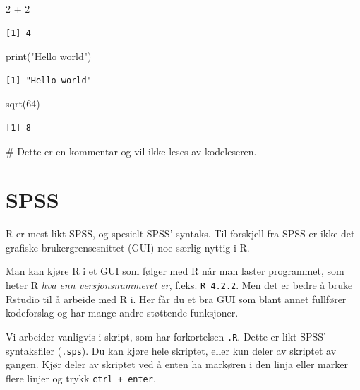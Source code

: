 \documentclass[
  letterpaper,
  DIV=11,
  numbers=noendperiod]{scrreprt}
\newenvironment{Shaded}{\begin{snugshade}}{\end{snugshade}}
\newcommand{\CommentTok}[1]{\textcolor[rgb]{0.37,0.37,0.37}{#1}}
\newcommand{\DecValTok}[1]{\textcolor[rgb]{0.68,0.00,0.00}{#1}}
\newcommand{\FunctionTok}[1]{\textcolor[rgb]{0.28,0.35,0.67}{#1}}
\newcommand{\NormalTok}[1]{\textcolor[rgb]{0.00,0.23,0.31}{#1}}
\newcommand{\SpecialCharTok}[1]{\textcolor[rgb]{0.37,0.37,0.37}{#1}}
\newcommand{\StringTok}[1]{\textcolor[rgb]{0.13,0.47,0.30}{#1}}
\begin{document}
\begin{Shaded}
\begin{Highlighting}[]
\DecValTok{2} \SpecialCharTok{+} \DecValTok{2} 
\end{Highlighting}
\end{Shaded}

\begin{verbatim}
[1] 4
\end{verbatim}

\begin{Shaded}
\begin{Highlighting}[]
\FunctionTok{print}\NormalTok{(}\StringTok{"Hello world"}\NormalTok{)}
\end{Highlighting}
\end{Shaded}

\begin{verbatim}
[1] "Hello world"
\end{verbatim}

\begin{Shaded}
\begin{Highlighting}[]
\FunctionTok{sqrt}\NormalTok{(}\DecValTok{64}\NormalTok{)}
\end{Highlighting}
\end{Shaded}

\begin{verbatim}
[1] 8
\end{verbatim}

\begin{Shaded}
\begin{Highlighting}[]
\CommentTok{\# Dette er en kommentar og vil ikke leses av kodeleseren.}
\end{Highlighting}
\end{Shaded}

\hypertarget{spss}{%
\section{SPSS}\label{spss}}

R er mest likt SPSS, og spesielt SPSS' syntaks. Til forskjell fra SPSS
er ikke det grafiske brukergrensesnittet (GUI) noe særlig nyttig i R.

Man kan kjøre R i et GUI som følger med R når man laster programmet, som
heter R \emph{hva enn versjonsnummeret er}, f.eks. \texttt{R\ 4.2.2}.
Men det er bedre å bruke Rstudio til å arbeide med R i. Her får du et
bra GUI som blant annet fullfører kodeforslag og har mange andre
støttende funksjoner.

Vi arbeider vanligvis i skript, som har forkortelsen \texttt{.R}. Dette
er likt SPSS' syntaksfiler (\texttt{.sps}). Du kan kjøre hele skriptet,
eller kun deler av skriptet av gangen. Kjør deler av skriptet ved å
enten ha markøren i den linja eller marker flere linjer og trykk
\texttt{ctrl\ +\ enter}.
\end{document}
